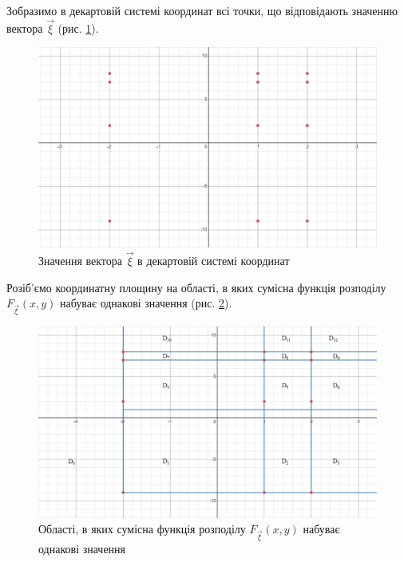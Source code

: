 \documentclass[14pt, a4paper, ukrainian]{extreport}
\begin{document}
	Зобразимо в декартовій системі координат всі точки, що відповідають значенню вектора $\vec \xi$ (рис. \ref{im:Fxy}).

	\begin{figure}[h!]
		\centering
		\includegraphics[width=\textwidth]{./Image/Im_03_Fxy_1}
		\caption{Значення вектора $\vec \xi$ в декартовій системі координат}
		\label{im:Fxy}
	\end{figure}

	Розіб'ємо координатну площину на області, в яких сумісна функція розподілу $F_{\vec \xi}(x, y)$ набуває однакові значення (рис. \ref{im:Fxy_D}).
		
	\begin{figure}[h!]
		\centering
		\includegraphics[width=\textwidth]{./Image/Im_04_Fxy_2}
		\caption{Області, в яких сумісна функція розподілу $F_{\vec \xi}(x, y)$ набуває однакові значення}
		\label{im:Fxy_D}
	\end{figure}
\end{document}
